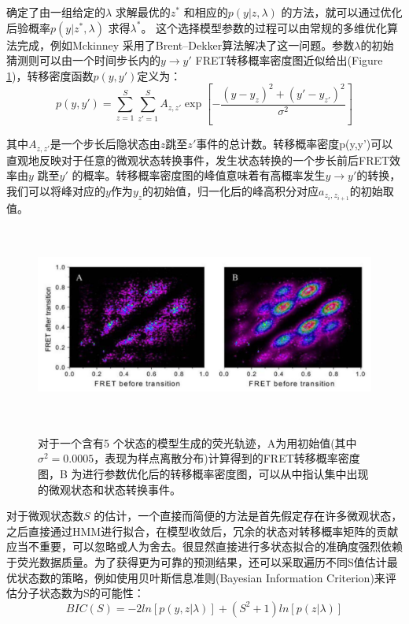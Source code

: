 \documentclass[11pt, a4paper]{article}
\begin{document}
确定了由一组给定的$\lambda$ 求解最优的$z^*$ 和相应的$p(y|z,\lambda)$ 的方法，就可以通过优化后验概率$p(y|z^*,\lambda)$ 求得$\lambda^*$。 这个选择模型参数的过程可以由常规的多维优化算法完成，例如Mckinney 采用了Brent–Dekker算法解决了这一问题\cite{Brent}。参数$\lambda$的初始猜测则可以由一个时间步长内的$y\rightarrow y'$ FRET转移概率密度图近似给出(Figure \ref{fig:tdp})，转移密度函数$p(y,y')$定义为：
\begin{equation}
p(y,y')=\sum_{z=1}^S \sum_{z'=1}^S A_{z, z'} \exp\left[-\frac{(y- y_{z})^2+(y'- y_{z'})^2}{\sigma^2}\right]
\end{equation}

其中$A_{z,z'}$是一个步长后隐状态由$z$跳至$z'$事件的总计数。转移概率密度p(y,y')可以直观地反映对于任意的微观状态转换事件，发生状态转换的一个步长前后FRET效率由$y$ 跳至$y'$ 的概率。转移概率密度图的峰值意味着有高概率发生$y\rightarrow y'$的转换，我们可以将峰对应的$y$作为$y_z$的初始值，归一化后的峰高积分对应$a_{z_{i}, z_{i+1}}$的初始取值。

\begin{figure}[htb]
  \centering
  \includegraphics[height=6.5cm]{Fig_tdp.PNG}\\
  \caption{对于一个含有5 个状态的模型生成的荧光轨迹，A为用初始值(其中$\sigma^2=0.0005$，表现为样点离散分布)计算得到的FRET转移概率密度图，B 为进行参数优化后的转移概率密度图，可以从中指认集中出现的微观状态和状态转换事件。}
  \label{fig:tdp}
\end{figure}


对于微观状态数$S$ 的估计，一个直接而简便的方法是首先假定存在许多微观状态，之后直接通过HMM进行拟合，在模型收敛后，冗余的状态对转移概率矩阵的贡献应当不重要，可以忽略或人为舍去。很显然直接进行多状态拟合的准确度强烈依赖于荧光数据质量。为了获得更为可靠的预测结果，还可以采取遍历不同S值估计最优状态数的策略，例如使用贝叶斯信息准则(Bayesian Information Criterion)来评估分子状态数为S的可能性：
\begin{equation}
BIC(S)=-2ln[p(y,z|\lambda)]+(S^2+1)ln[p(z|\lambda)]
\end{equation}
\end{document}
